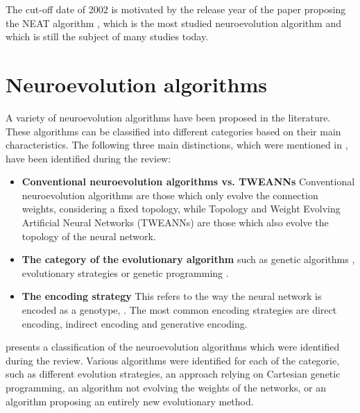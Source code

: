The cut-off date of 2002 is motivated by the release year of the paper proposing the NEAT algorithm \cite{neat}, which is the most studied neuroevolution algorithm and which
is still the subject of many studies today.

\section{Neuroevolution algorithms}

A variety of neuroevolution algorithms have been proposed in the literature.
These algorithms can be classified into different categories based on their main characteristics.
The following three main distinctions, which were mentioned in , have been identified during the review:

\begin{itemize}
    \item \textbf{Conventional neuroevolution algorithms vs. TWEANNs} Conventional neuroevolution algorithms are those which only evolve the connection weights,
        considering a fixed topology, while Topology and Weight Evolving Artificial Neural Networks (TWEANNs) \cite{neat} are those which also evolve the topology of the
        neural network.
    \item \textbf{The category of the evolutionary algorithm} such as genetic algorithms \cite{genetic_alg,genetic_alg_review}, evolutionary strategies \cite{es_intro} or
        genetic programming \cite{cartesian_gp}.
    \item \textbf{The encoding strategy} This refers to the way the neural network is encoded as a genotype, \cite{neuroevolution_learning,neuroevolution_trends,neuroevolution_survey}.
        The most common encoding strategies are direct encoding, indirect encoding and generative encoding.
\end{itemize}

 presents a classification of the neuroevolution algorithms which were identified during the review.
Various algorithms were identified for each of the categorie, such as different evolution strategies, an approach relying on Cartesian genetic programming, an algorithm not evolving the
weights of the networks, or an algorithm proposing an entirely new evolutionary method.

